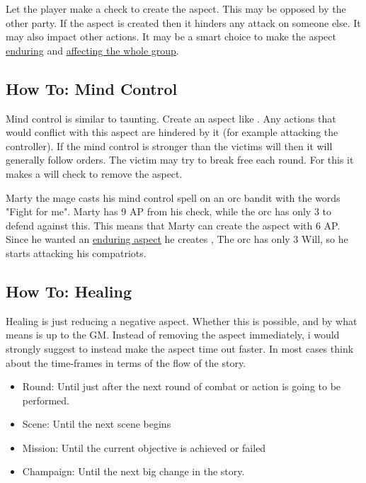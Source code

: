 \documentclass[11pt]{article}
\begin{document}
{Let the player make a check to create the  aspect. This may be opposed by the other party. If the aspect is created then it hinders any attack on someone else. It may also impact other actions. It may be a smart choice to make the  aspect \hyperref[sec:org97ab889]{enduring} and \hyperref[sec:org3c6e127]{affecting the whole group}. 
\subsection{How To: Mind Control}
\label{sec:org28711fa}
Mind control is similar to taunting. Create an aspect like . Any actions that would conflict with this aspect are hindered by it (for example attacking the controller). If the mind control is stronger than the victims will then it will generally follow orders. The victim may try to break free each round. For this it makes a will check to remove the  aspect.

\begin{pwexample}
Marty the mage casts his mind control spell on an orc bandit with the words "Fight for me". Marty has 9 AP from his check, while the orc has only 3 to defend against this. This means that Marty can create the aspect with 6 AP. Since he wanted an \hyperref[sec:org97ab889]{enduring aspect} he creates , The orc has only 3 Will, so he starts attacking his compatriots. 
\end{pwexample}
\subsection{How To: Healing}
\label{sec:org6a9ace0}
Healing is just reducing a negative aspect. Whether this is possible, and by what means is up to the GM. Instead of removing the aspect immediately, i would strongly suggest to instead make the aspect time out faster. In most cases think about the time-frames in terms of the flow of the story.
\begin{itemize}
\item Round: Until just after the next round of combat or action is going to be performed.
\item Scene: Until the next scene begins
\item Mission: Until the current objective is achieved or failed
\item Champaign: Until the next big change in the story.
\end{itemize}

}
\end{document}
